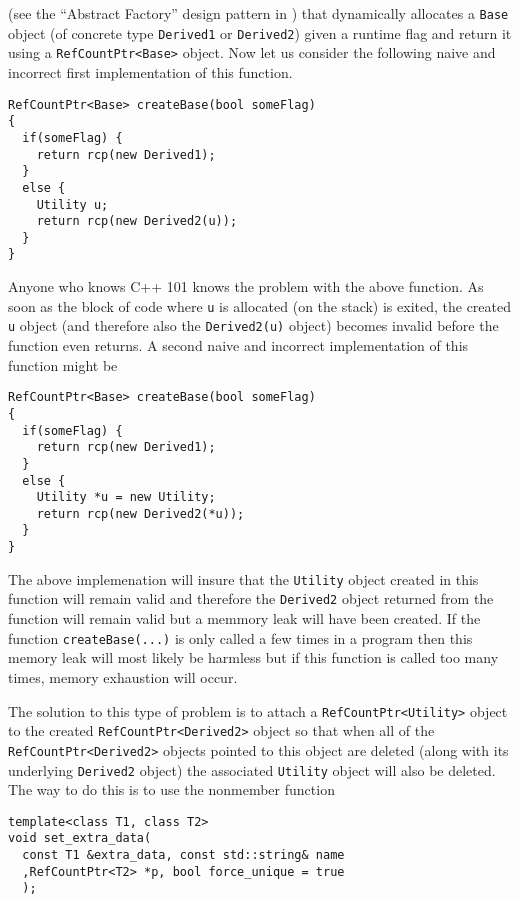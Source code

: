 {}\indent{}(see the ``Abstract Factory'' design pattern in
{}\cite{ref:gama_et_al_1995}) that dynamically allocates a
{}\texttt{Base} object (of concrete type {}\texttt{Derived1} or
{}\texttt{Derived2}) given a runtime flag and return it using a
{}\texttt{RefCountPtr<Base>} object.  Now let us consider the
following naive and incorrect first implementation of this function.

{\scriptsize\begin{verbatim}
RefCountPtr<Base> createBase(bool someFlag)
{
  if(someFlag) {
    return rcp(new Derived1);
  }
  else {
    Utility u;
    return rcp(new Derived2(u));
  }
}
\end{verbatim}

}{}\noindent{}Anyone who knows C++ 101 knows the problem with the
above function.  As soon as the block of code where {}\texttt{u} is
allocated (on the stack) is exited, the created {}\texttt{u} object
(and therefore also the {}\texttt{Derived2(u)} object) becomes invalid
before the function even returns.  A second naive and incorrect
implementation of this function might be

{\scriptsize\begin{verbatim}
RefCountPtr<Base> createBase(bool someFlag)
{
  if(someFlag) {
    return rcp(new Derived1);
  }
  else {
    Utility *u = new Utility;
    return rcp(new Derived2(*u));
  }
}
\end{verbatim}}

{}\noindent{} The above implemenation will insure that the
{}\texttt{Utility} object created in this function will remain valid
and therefore the {}\texttt{Derived2} object returned from the
function will remain valid but a memmory leak will have been created.
If the function {}\texttt{create\-Base(...)}  is only called a few
times in a program then this memory leak will most likely be harmless
but if this function is called too many times, memory exhaustion will
occur.

The solution to this type of problem is to attach a
{}\texttt{RefCountPtr<Utility>} object to the created
{}\texttt{RefCountPtr<Derived2>} object so that when all of the
{}\texttt{RefCountPtr<Derived2>} objects pointed to this object are
deleted (along with its underlying {}\texttt{Derived2} object) the
associated {}\texttt{Utility} object will also be deleted.  The way to
do this is to use the nonmember function

{\scriptsize\begin{verbatim}
template<class T1, class T2>
void set_extra_data(
  const T1 &extra_data, const std::string& name
  ,RefCountPtr<T2> *p, bool force_unique = true
  );
\end{verbatim}}

